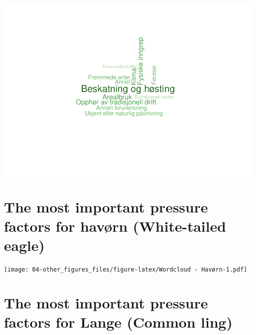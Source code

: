 \documentclass[
]{book}
\newenvironment{Shaded}{\begin{snugshade}}{\end{snugshade}}
\newcommand{\AttributeTok}[1]{\textcolor[rgb]{0.77,0.63,0.00}{#1}}
\newcommand{\ConstantTok}[1]{\textcolor[rgb]{0.00,0.00,0.00}{#1}}
\newcommand{\DecValTok}[1]{\textcolor[rgb]{0.00,0.00,0.81}{#1}}
\newcommand{\FloatTok}[1]{\textcolor[rgb]{0.00,0.00,0.81}{#1}}
\newcommand{\FunctionTok}[1]{\textcolor[rgb]{0.00,0.00,0.00}{#1}}
\newcommand{\NormalTok}[1]{#1}
\newcommand{\SpecialCharTok}[1]{\textcolor[rgb]{0.00,0.00,0.00}{#1}}
\begin{document}
\includegraphics{04-other_figures_files/figure-latex/Wordcloud - Elg-1.pdf}

\hypertarget{the-most-important-pressure-factors-for-havuxf8rn-white-tailed-eagle}{%
\section{The most important pressure factors for havørn (White-tailed eagle)}\label{the-most-important-pressure-factors-for-havuxf8rn-white-tailed-eagle}}

\begin{Shaded}
\end{Shaded}

\texttt{[image: 04-other\_figures\_files/figure-latex/Wordcloud - Havørn-1.pdf]}

\hypertarget{the-most-important-pressure-factors-for-lange-common-ling}{%
\section{The most important pressure factors for Lange (Common ling)}\label{the-most-important-pressure-factors-for-lange-common-ling}}
\end{document}
